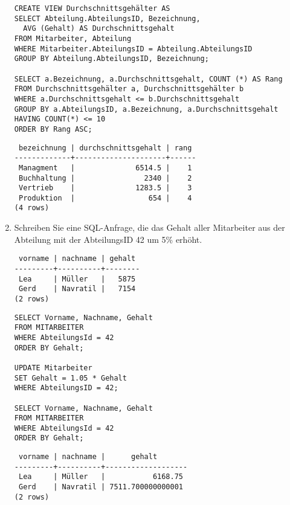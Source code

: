 \documentclass{bschlangaul-aufgabe}
\begin{document}
\begin{enumerate}
\begin{bAntwort}
\begin{verbatim}
CREATE VIEW Durchschnittsgehälter AS
SELECT Abteilung.AbteilungsID, Bezeichnung,
  AVG (Gehalt) AS Durchschnittsgehalt
FROM Mitarbeiter, Abteilung
WHERE Mitarbeiter.AbteilungsID = Abteilung.AbteilungsID
GROUP BY Abteilung.AbteilungsID, Bezeichnung;

SELECT a.Bezeichnung, a.Durchschnittsgehalt, COUNT (*) AS Rang
FROM Durchschnittsgehälter a, Durchschnittsgehälter b
WHERE a.Durchschnittsgehalt <= b.Durchschnittsgehalt
GROUP BY a.AbteilungsID, a.Bezeichnung, a.Durchschnittsgehalt
HAVING COUNT(*) <= 10
ORDER BY Rang ASC;
\end{verbatim}

\begin{verbatim}
 bezeichnung | durchschnittsgehalt | rang
-------------+---------------------+------
 Managment   |              6514.5 |    1
 Buchhaltung |                2340 |    2
 Vertrieb    |              1283.5 |    3
 Produktion  |                 654 |    4
(4 rows)
\end{verbatim}
\end{bAntwort}


\item Schreiben Sie eine SQL-Anfrage, die das Gehalt aller Mitarbeiter
aus der Abteilung mit der AbteilungsID 42 um 5\% erhöht.

\begin{bAntwort}
\begin{verbatim}
 vorname | nachname | gehalt
---------+----------+--------
 Lea     | Müller   |   5875
 Gerd    | Navratil |   7154
(2 rows)
\end{verbatim}

\begin{verbatim}
SELECT Vorname, Nachname, Gehalt
FROM MITARBEITER
WHERE AbteilungsId = 42
ORDER BY Gehalt;

UPDATE Mitarbeiter
SET Gehalt = 1.05 * Gehalt
WHERE AbteilungsID = 42;

SELECT Vorname, Nachname, Gehalt
FROM MITARBEITER
WHERE AbteilungsId = 42
ORDER BY Gehalt;
\end{verbatim}

\begin{verbatim}
 vorname | nachname |      gehalt
---------+----------+-------------------
 Lea     | Müller   |           6168.75
 Gerd    | Navratil | 7511.700000000001
(2 rows)
\end{verbatim}
\end{bAntwort}


\end{enumerate}
\end{document}
